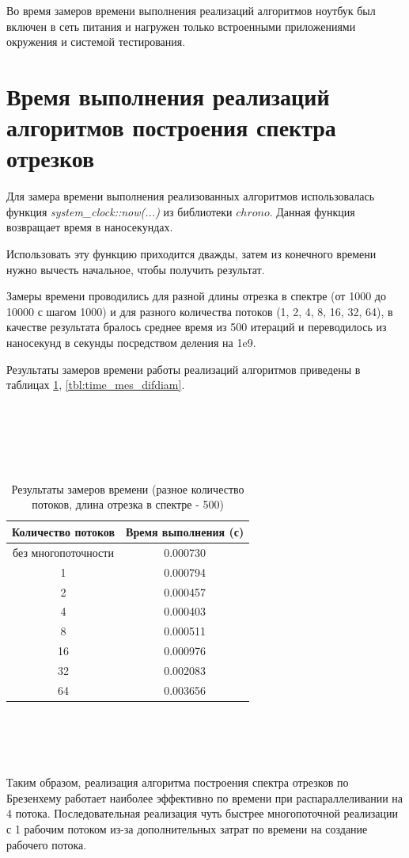 Во время замеров времени выполнения реализаций алгоритмов ноутбук был включен в сеть питания и нагружен только встроенными приложениями окружения и системой тестирования.

\section{Время выполнения реализаций алгоритмов построения спектра отрезков}
Для замера времени выполнения реализованных алгоритмов использовалась функция \textit{system\_clock::now(...)} из библиотеки $chrono$. Данная функция возвращает время в наносекундах.

Использовать эту функцию приходится дважды, затем из конечного времени нужно вычесть начальное, чтобы получить результат.

Замеры времени проводились для разной длины отрезка в спектре (от 1000 до 10000 с шагом 1000) и для разного количества потоков (1, 2, 4, 8, 16, 32, 64), в качестве результата бралось среднее время из 500 итераций и переводилось из наносекунд в секунды посредством деления на 1e9.

Результаты замеров времени работы реализаций алгоритмов приведены в таблицах \ref{tbl:time_mes_par}, \ref{tbl:time_mes_difdiam}.
\\
\\
\\
\\
\\
\\
\begin{table}[h]
    \begin{center}
        \caption{Результаты замеров времени (разное количество потоков, длина отрезка в спектре - 500)}
        \label{tbl:time_mes_par}
        \begin{tabular}{|c|c|}
            \hline
            Количество потоков & Время выполнения (с) \\
            \hline
            без многопоточности & 0.000730 \\ \hline
            1 & 0.000794 \\ \hline 
            2 & 0.000457 \\ \hline 
            4 & 0.000403 \\ \hline 
            8 & 0.000511 \\ \hline 
            16 & 0.000976 \\ \hline 
            32 & 0.002083 \\ \hline 
            64 & 0.003656 \\ \hline
		\end{tabular}
\end{center}
\end{table}
\\
\\
\\
\\
\FloatBarrier
Таким образом, реализация алгоритма построения спектра отрезков по Брезенхему работает наиболее эффективно по времени при распараллеливании на 4 потока.
Последовательная реализация чуть быстрее многопоточной реализации с 1 рабочим потоком из-за дополнительных затрат по времени на создание рабочего потока.

